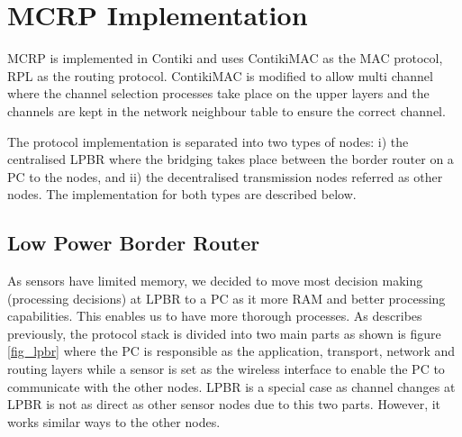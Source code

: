 

\section{MCRP Implementation}
MCRP is implemented in Contiki and uses ContikiMAC as the MAC protocol, RPL as the routing protocol. ContikiMAC is modified to allow multi channel where the channel selection processes take place on the upper layers and the channels are kept in the network neighbour table to ensure the correct channel.

The protocol implementation is separated into two types of nodes: i) the centralised LPBR where the bridging takes place between the border router on a PC to the nodes, and ii) the decentralised transmission nodes referred as other nodes. The implementation for both types are described below.



\subsection{Low Power Border Router}
As sensors have limited memory, we decided to move most decision making (processing decisions) at LPBR to a PC as it more RAM and better processing capabilities. This enables us to have more thorough processes. As describes previously, the protocol stack is divided into two main parts as shown is figure \ref{fig_lpbr} where the PC is responsible as the application, transport, network and routing layers while a sensor is set as the wireless interface to enable the PC to communicate with the other nodes. LPBR is a special case as channel changes at LPBR is not as direct as other sensor nodes due to this two parts. However, it works similar ways to the other nodes.

